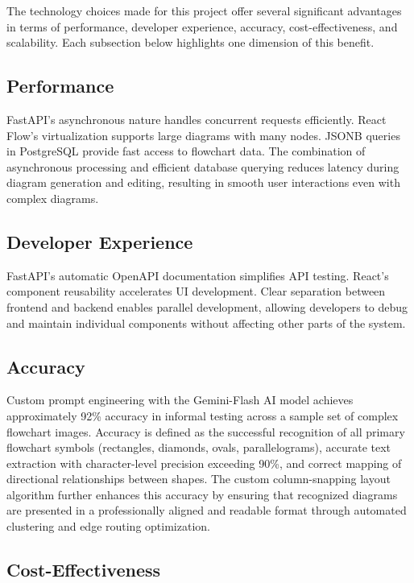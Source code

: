 The technology choices made for this project offer several 
significant advantages in terms of performance, developer 
experience, accuracy, cost-effectiveness, and scalability. 
Each subsection below highlights one dimension of this 
benefit.

\subsection{Performance}
\label{subsec:performance}

FastAPI's asynchronous nature handles concurrent requests 
efficiently. React Flow's virtualization supports large 
diagrams with many nodes. JSONB queries in PostgreSQL provide 
fast access to flowchart data. The combination of asynchronous 
processing and efficient database querying reduces latency 
during diagram generation and editing, resulting in smooth 
user interactions even with complex 
diagrams.

\subsection{Developer Experience}
\label{subsec:dev-experience}

FastAPI's automatic OpenAPI documentation simplifies API 
testing. React's component reusability accelerates UI 
development. Clear separation between frontend and backend 
enables parallel development, allowing developers to debug 
and maintain individual components without affecting other 
parts of the system.

\subsection{Accuracy}
\label{subsec:accuracy}

Custom prompt engineering with the Gemini-Flash AI model achieves approximately 92\% accuracy in informal testing across a sample set of complex flowchart images. Accuracy is defined as the successful recognition of all primary flowchart symbols (rectangles, diamonds, ovals, parallelograms), accurate text extraction with character-level precision exceeding 90\%, and correct mapping of directional relationships between shapes. The custom column-snapping layout algorithm further enhances this accuracy by ensuring that recognized diagrams are presented in a professionally aligned and readable format through automated clustering and edge routing optimization.

\subsection{Cost-Effectiveness}
\label{subsec:cost}

